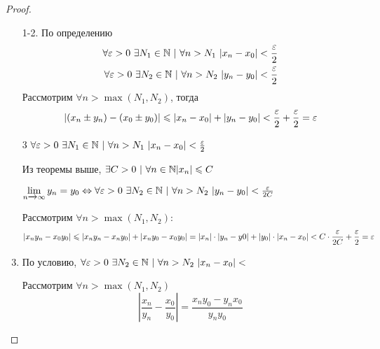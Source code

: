 \begin{proof}
\begin{enumerate}
    \item[1-2.] 
    По определению
    \begin{align*}
        \forall \eps > 0\ \exists N_1 \in \N\ |\ \forall n > N_1\ |x_n - x_0| < \frac{\eps}{2}
        \\
        \forall \eps > 0\ \exists N_2 \in \N\ |\ \forall n > N_2\ |y_n - y_0| < \frac{\eps}{2}
    \end{align*}
    Рассмотрим $\forall n > \max(N_1, N_2)$, тогда
    $$
        |(x_n \pm y_n) - (x_0 \pm y_0)| \leqslant |x_n - x_0| + |y_n - y_0| < \frac{\varepsilon}{2} + \frac{\varepsilon}{2} = \varepsilon
    $$
    \item[3] 
    $\forall \varepsilon > 0\ \exists N_1 \in \mathbb{N}\ |\ \forall n > N_1\ |x_n - x_0| < \frac{\varepsilon}{2}$
    
    Из теоремы выше, $\exists C > 0\ |\ \forall n \in \N |x_n| \le C$
    
    $\liml_{n \xrightarrow{} \infty} y_n = y_0 \lra \forall \eps > 0\ \exists N_2 \in \N\ |\ \forall n > N_2\ |y_n - y_0| < \frac{\eps}{2C}$
    
    Рассмотрим $\forall n > \max(N_1, N_2)$:
    $$
        |x_n y_n - x_0 y_0| \leqslant |x_n y_n - x_n y_0| + |x_n y_0 - x_0 y_0| = |x_n| \cdot |y_n - y0| + |y_0| \cdot |x_n - x_0| < C \cdot \frac{\varepsilon}{2C} + \frac{\varepsilon}{2} = \varepsilon
    $$
    \item 
    По условию, $\forall \eps > 0\ \exists N_2 \in \N\ |\ \forall n > N_2\ |x_n - x_0| < $
    
    Рассмотрим $\forall n > \max(N_1, N_2)$
    $$
        \left|\frac{x_n}{y_n} - \frac{x_0}{y_0}\right| = \frac{x_n y_0 - y_n x_0}{y_n y_0}
    $$
\end{enumerate}
\end{proof}